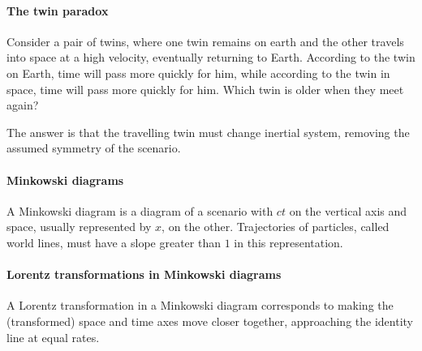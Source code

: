 \paragraph{The twin paradox}
Consider a pair of twins, where one twin remains on earth and the other travels into space at a high velocity, eventually returning to Earth. According to the twin on Earth, time will pass more quickly for him, while according to the twin in space, time will pass more quickly for him. Which twin is older when they meet again?

The answer is that the travelling twin must change inertial system, removing the assumed symmetry of the scenario.

\paragraph{Minkowski diagrams}
A Minkowski diagram is a diagram of a scenario with $ct$ on the vertical axis and space, usually represented by $x$, on the other. Trajectories of particles, called world lines, must have a slope greater than $1$ in this representation.

\paragraph{Lorentz transformations in Minkowski diagrams}
A Lorentz transformation in a Minkowski diagram corresponds to making the (transformed) space and time axes move closer together, approaching the identity line at equal rates.